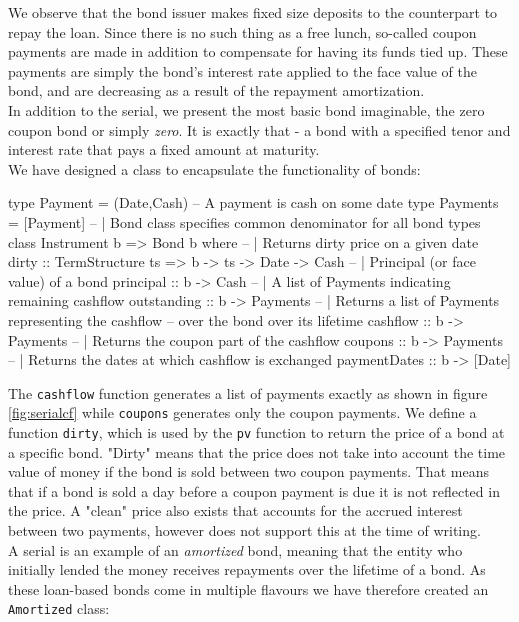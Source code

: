 We observe that the bond issuer makes fixed size deposits to the counterpart to 
repay the loan. Since there is no such thing as a free lunch, so-called coupon 
payments are made in addition to compensate for having its funds tied up. These
payments are simply the bond's interest rate applied to the face value of the
bond, and are decreasing as a result of the repayment amortization\cite{hqldoc}.\\

In addition to the serial, we present the most basic bond imaginable, the zero 
coupon bond or simply \emph{zero}. It is exactly that - a bond with a specified 
tenor and interest rate that pays a fixed amount at maturity.\\

We have designed a class to encapsulate the functionality of bonds:

\begin{hscode}
type Payment = (Date,Cash) -- A payment is cash on some date
type Payments = [Payment]
-- | Bond class specifies common denominator for all bond types 
class Instrument b => Bond b where
  -- | Returns dirty price on a given date
  dirty :: TermStructure ts => b -> ts -> Date -> Cash
  -- | Principal (or face value) of a bond
  principal    :: b -> Cash
  -- | A list of Payments indicating remaining cashflow
  outstanding  :: b -> Payments
  -- | Returns a list of Payments representing the cashflow
  -- over the bond over its lifetime
  cashflow     :: b -> Payments
  -- | Returns the coupon part of the cashflow
  coupons      :: b -> Payments
  -- | Returns the dates at which cashflow is exchanged
  paymentDates :: b -> [Date]
\end{hscode}

The \texttt{cashflow} function generates a list of payments exactly as shown
in figure \ref{fig:serialcf} while \texttt{coupons} generates only the coupon
payments. We define a function \texttt{dirty}, which is used by the \texttt{pv}
function to return the price of a bond at a specific bond. "Dirty" means that
the price does not take into account the time value of money if the bond is
sold between two coupon payments. That means that if a bond is sold a day before
a coupon payment is due it is not reflected in the price. A "clean" price also
exists that accounts for the accrued interest between two payments, however
\hql does not support this at the time of writing.\\

A serial is an example of an \emph{amortized} bond, meaning that the entity
who initially lended the money receives repayments over
the lifetime of a bond. As these loan-based bonds come in multiple flavours
we have therefore created an \texttt{Amortized} class:

